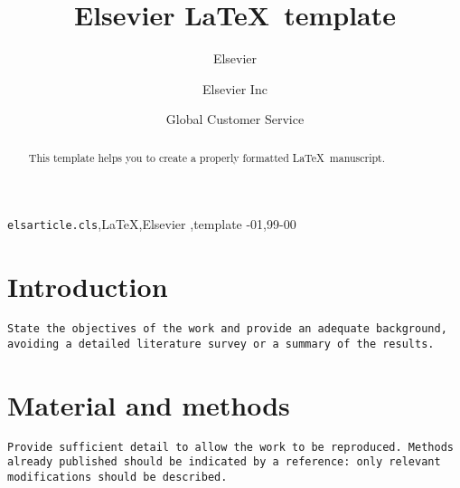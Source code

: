 \documentclass[review]{elsarticle}
\begin{document}
\begin{frontmatter}

\title{Elsevier \LaTeX\ template}

\author{Elsevier}
\address{Radarweg 29, Amsterdam}

\author[mymainaddress,mysecondaryaddress]{Elsevier Inc}

\author[mysecondaryaddress]{Global Customer Service}

\address[mymainaddress]{1600 John F Kennedy Boulevard, Philadelphia}
\address[mysecondaryaddress]{360 Park Avenue South, New York}

\begin{abstract}
This template helps you to create a properly formatted \LaTeX\ manuscript.
\end{abstract}

\begin{keyword}
\texttt{elsarticle.cls}\sep \LaTeX\sep Elsevier \sep template
-01\sep  99-00
\end{keyword}

\end{frontmatter}

\linenumbers



\section{Introduction} 
\texttt{State the objectives of the work and provide an adequate background, avoiding a detailed literature survey or a summary of the results.}


\section{Material and methods} 
\texttt{Provide sufficient detail to allow the work to be reproduced. Methods already published should be indicated by a reference: only relevant modifications should be described.}
\end{document}
